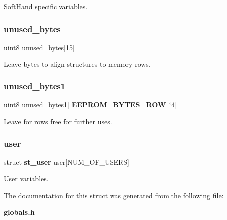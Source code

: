 Soft\+Hand specific variables. \mbox{\label{structst__eeprom_a23db079f0c6d3e264be3fb547f32403c}} 
\subsubsection{unused\+\_\+bytes}
{\footnotesize\ttfamily uint8 unused\+\_\+bytes[15]}

Leave bytes to align structures to memory rows. \mbox{\label{structst__eeprom_a0299e605ae8eb46c7aa7886e6b302a0f}} 
\subsubsection{unused\+\_\+bytes1}
{\footnotesize\ttfamily uint8 unused\+\_\+bytes1[\textbf{ E\+E\+P\+R\+O\+M\+\_\+\+B\+Y\+T\+E\+S\+\_\+\+R\+OW} $\ast$4]}

Leave for rows free for further uses. \mbox{\label{structst__eeprom_a59282a1a28a7fc333cd680c9a8988b93}} 
\subsubsection{user}
{\footnotesize\ttfamily struct \textbf{ st\+\_\+user} user[N\+U\+M\+\_\+\+O\+F\+\_\+\+U\+S\+E\+RS]}

User variables. 

The documentation for this struct was generated from the following file\+:\begin{DoxyCompactItemize}
\item 
\textbf{ globals.\+h}\end{DoxyCompactItemize}
